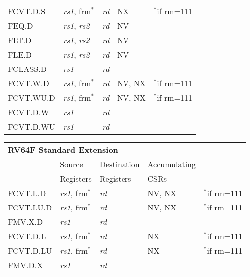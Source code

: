 \begin{tabular}{p{3cm}|p{25mm}|p{3cm}|p{4cm}|p{4cm}}
   FCVT.D.S & {\em rs1}, frm$^*$ & {\em rd} & NX & $^*$if rm=111  \\
   \cline{2-4}
   FEQ.D & {\em rs1}, {\em rs2} & {\em rd} & NV &   \\
   \cline{2-4}
   FLT.D & {\em rs1}, {\em rs2} & {\em rd} & NV &   \\
   \cline{2-4}
   FLE.D & {\em rs1}, {\em rs2} & {\em rd} & NV &   \\
   \cline{2-4}
   FCLASS.D & {\em rs1} & {\em rd} &   & \\
   \cline{2-4}
   FCVT.W.D & {\em rs1}, frm$^*$ & {\em rd} & NV, NX & $^*$if rm=111  \\
   \cline{2-4}
   FCVT.WU.D & {\em rs1}, frm$^*$ & {\em rd} & NV, NX & $^*$if rm=111  \\
   \cline{2-4}
   FCVT.D.W & {\em rs1} & {\em rd} &  & \\
   \cline{2-4}
   FCVT.D.WU & {\em rs1} & {\em rd} &  & \\
   \cline{2-4}
\end{tabular}

\begin{tabular}{p{3cm}|p{25mm}|p{3cm}|p{4cm}|p{4cm}}
  \multicolumn{4}{l}{\bf RV64F Standard Extension} \\
  \cline{2-4}
   & Source    & Destination & Accumulating \\
   & Registers & Registers   & CSRs \\
  \cline{2-4}
   FCVT.L.D & {\em rs1}, frm$^*$ & {\em rd} & NV, NX & $^*$if rm=111  \\
   \cline{2-4}
   FCVT.LU.D & {\em rs1}, frm$^*$ & {\em rd} & NV, NX & $^*$if rm=111  \\
   \cline{2-4}
   FMV.X.D & {\em rs1} & {\em rd} &   & \\
   \cline{2-4}
   FCVT.D.L & {\em rs1}, frm$^*$ & {\em rd} & NX & $^*$if rm=111  \\
   \cline{2-4}
   FCVT.D.LU & {\em rs1}, frm$^*$ & {\em rd} & NX & $^*$if rm=111  \\
   \cline{2-4}
   FMV.D.X & {\em rs1} & {\em rd} &   & \\
   \cline{2-4}
\end{tabular}
